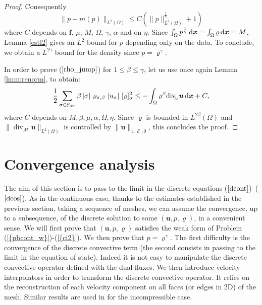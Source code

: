 \documentclass{amsart}
\numberwithin{equation}{section}
\begin{document}
\begin{proof}
Consequently
\begin{equation*}
\| p-m(p) \|_{L^2(\Omega)} \le C( \| p \|_{L^2(\Omega)}^{\frac{1}{\gamma}} +1)
\end{equation*}
where $C$ depends on ${{\boldsymbol f}}$, $\mu$, ${M}$, $\Omega$, $\gamma$, $\alpha$ and on $\eta$. Since $\int_\Omega p^{\frac{1}{\gamma}} {\, {\rm d}{{\boldsymbol x}}} = \int_\Omega {\varrho} {\, {\rm d}{{\boldsymbol x}}} =M$, Lemma \ref{estl2} gives an $L^2$ bound for $p$ depending only on the data. To conclude, we obtain a $L^{2\gamma}$ bound for the density since $p = {\varrho}^\gamma$.

In order to prove ($\ref{rho_jump}$) for $1 \le \beta \le \gamma$, let us use once again Lemma \ref{lmm:renorm}, to obtain:
\[
\frac 1 2 \sum_{{{\sigma}} \in {{\mathcal E}_{\rm int}}} \beta\, |{{\sigma}}|\  {\varrho}_{{{\sigma}},\beta} \ |{{u}_{{\sigma}}}|\ [{\varrho}]_{{\sigma}}^2
\leq -\int_\Omega {\varrho}^\beta {{\rm div}_{\hspace{-0.2em}\raisebox{-0.1em}{\scalebox{0.5}{${{\mathcal M}}$}}}} {{\boldsymbol u}} {\, {\rm d}{{\boldsymbol x}}}+ C,
\]
where $C$ depends on $ M,\beta,\mu,\alpha,\Omega,\eta$. Since ${\varrho}$ is bounded in $L^{2\beta}(\Omega)$ and $ \| \operatorname{div}_{{\mathcal M}} {{\boldsymbol u}} \|_{L^2(\Omega)} $ is controlled by $\| {{\boldsymbol u}} \|_{1,\operatorname{{\mathcal{E}}},0} $, this
concludes the proof.

\end{proof}

\section{Convergence analysis}\label{sec:qdm_and_mass}

The aim of this section is to pass to the limit in the discrete equations ($\ref{dcont}$)--($\ref{deos}$). As in the continuous case, thanks to the estimates established in the previous section, taking a sequence of meshes, we can assume the convergence, up to a subsequence, of the  discrete solution to some $({\bm{u}},p,{\varrho})$, in a convenient sense. We will first prove that $({{\boldsymbol u}},p,{\varrho})$ satisfies the weak form of Problem {(\ref{{pbcont_w}})}-{(\ref{{ci2}})}. We then prove that $ p={\varrho}^\gamma $.
The first difficulty is the convergence of the discrete convective term (the second  consists in passing to the limit in the equation of state). Indeed it is not easy to manipulate the discrete convective operator defined with the dual fluxes.
We then introduce velocity interpolators  in order to  transform the discrete convective operator. 
It relies on the reconstruction of each velocity component on all faces (or edges in 2D) of the mesh.
Similar results are used in \cite{gallouet2015convergence} for the  incompressible case.
\end{document}
